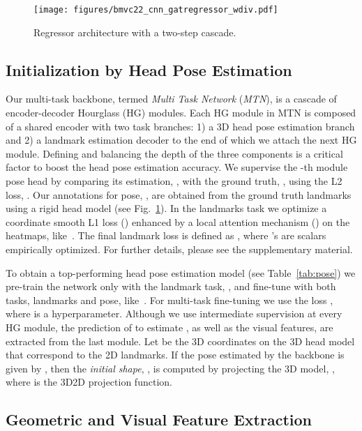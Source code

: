 \documentclass{bmvc2k}
\begin{document}
\begin{figure}
    \centering
    \texttt{[image: figures/bmvc22\_cnn\_gatregressor\_wdiv.pdf]}
    \caption{Regressor architecture with a two-step cascade.}
    \label{fig:cascade_regressor_full}
\end{figure}


\subsection{Initialization by Head Pose Estimation}
\label{sec:init_3dpose}

Our multi-task backbone, termed \emph{Multi Task Network} (\emph{MTN}), is a cascade of  encoder-decoder Hourglass (HG) 
modules.
Each HG module in MTN is composed of a shared encoder with two task branches: 
1) a 3D head pose estimation branch and 2) a landmark estimation decoder to the end of which we attach the next HG module. Defining and balancing the depth of the three components is a critical factor to boost the head pose estimation accuracy. We supervise the -th module pose 
head by comparing its estimation, , with the ground truth, , using the L2 loss, . Our annotations for pose, , are obtained from the ground truth landmarks using a rigid head model (see Fig.~\ref{fig:cascade_regressor_full}). In the landmarks task we optimize a coordinate smooth L1 loss () enhanced by a local attention mechanism () on the heatmaps, like~\cite{Wang19Awing,Huang21ADnet}. The final landmark loss is defined as , where 's are scalars empirically optimized. For further details, please see the supplementary material.

To obtain a top-performing head pose estimation model (see Table~\ref{tab:pose})
we pre-train the network only with the landmark task, , and fine-tune with both tasks, landmarks and pose, like~\cite{Valle21}. For multi-task fine-tuning we use the loss  , where  is a hyperparameter. Although we use intermediate supervision at every HG module, the prediction of  to estimate , as well as the visual features, are extracted from the last module. Let  be the 3D coordinates on the 3D head model that correspond to the  2D landmarks. If the pose estimated by the backbone is given by , then the \emph{initial shape}, , is computed by projecting the 3D model, , where  is the 3D2D projection function. 



\subsection{Geometric and Visual Feature Extraction}
\label{sec:features}
\end{document}
